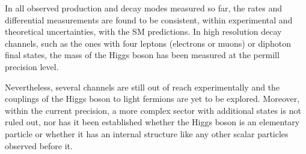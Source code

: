 In all observed production and decay modes measured so far, the rates and differential measurements are found to be consistent, within experimental and theoretical uncertainties, with the SM predictions. In high resolution decay channels, such as the ones with four leptons (electrons or muons) or diphoton final states, the mass of the Higgs boson has been measured at the permill precision level.

Nevertheless, several channels are still out of reach experimentally and the couplings of the Higgs boson to light fermions are yet to be explored. Moreover, within the current precision, a more complex sector with additional states is not ruled out, nor has it been established whether the Higgs boson is an elementary particle or whether it has an internal structure like any other scalar particles observed before it.

